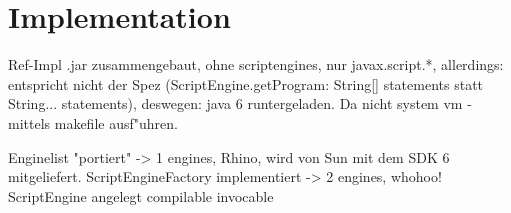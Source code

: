 \section{Implementation}
\label{sec:chap1:impl}

Ref-Impl .jar zusammengebaut, ohne scriptengines, nur javax.script.*, allerdings: entspricht nicht der Spez 
(ScriptEngine.getProgram: String[] statements statt String... statements), deswegen: java 6 runtergeladen.
Da nicht system vm - mittels makefile ausf"uhren.

Enginelist "portiert" -> 1 engines, Rhino, wird von Sun mit dem SDK 6 mitgeliefert.
ScriptEngineFactory implementiert -> 2 engines, whohoo!
ScriptEngine angelegt
compilable
invocable




